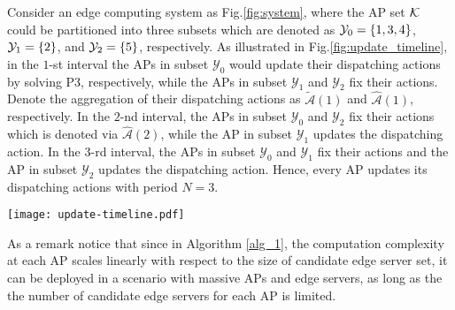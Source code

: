 \begin{example}
    \label{exp:update}
    Consider an edge computing system as Fig.\ref{fig:system}, where the AP set $\mathcal{K}$ could be partitioned into three subsets which are denoted as $\mathcal{Y}_{0} = \{1,3,4\}$, $\mathcal{Y}_{1} = \{2\}$, and $\mathcal{Y}_{2} = \{5\}$, respectively.
    As illustrated in Fig.\ref{fig:update_timeline}, in the $1$-st interval the APs in subset $\mathcal{Y}_{0}$ would update their dispatching actions by solving P3, respectively, while the APs in subset $\mathcal{Y}_{1}$ and $\mathcal{Y}_{2}$ fix their actions.
    Denote the aggregation of their dispatching actions as $\tilde{\mathcal{A}}(1)$ and $\hat{\mathcal{A}}(1)$, respectively.
    In the $2$-nd interval, the APs in subset $\mathcal{Y}_{0}$ and $\mathcal{Y}_{2}$ fix their actions which is denoted via $\hat{\mathcal{A}}(2)$, while 
    the AP in subset $\mathcal{Y}_{1}$ updates the dispatching action. %
    In the $3$-rd interval, the APs in subset $\mathcal{Y}_{0}$ and $\mathcal{Y}_{1}$ fix their actions and the AP in subset $\mathcal{Y}_{2}$ updates the dispatching action.
    Hence, every AP {updates} its dispatching actions with period $N=3$.
    \begin{figure*}[htp!]
        \centering
        \texttt{[image: update-timeline.pdf]}
        \caption{The Illustration of Example \ref{exp:update}.}
        \label{fig:update_timeline}
    \end{figure*}
\end{example}

As a remark notice that since in Algorithm \ref{alg_1}, the computation complexity at each AP scales linearly with respect to {the size of candidate edge server set}, it can be deployed in a scenario with massive APs and edge servers, as long as the {the number of candidate edge servers for each AP} is limited.


